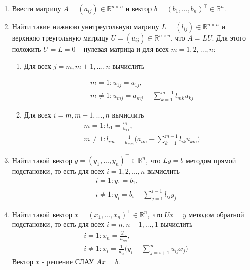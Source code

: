 \documentclass[a4paper, 12pt]{article}
\begin{document}
	\begin{enumerate}
		\item Ввести матрицу $A=(a_{ij})\in \mathbb{R}^{n\times n}$ и вектор $b=(b_1,...,b_n)^\top\in \mathbb{R}^n$.
		\item Найти такие нижнюю унитреугольную матрицу $L=(l_{ij})\in \mathbb{R}^{n\times n}$ и верхнюю треугольную матрицу $U=(u_{ij})\in \mathbb{R}^{n\times n}$, что $A=LU$. Для этого положить $U=L=0$ -- нулевая матрица и
		для всех $m = 1,2,...,n$:
		\begin{enumerate}
			\item Для всех $j = m,m+1,...,n$ вычислить

			\begin{equation} 
				\label{U_formula}
				\begin{aligned}
					&m=1:u_{1j}=a_{1j}, \\
					&m\neq 1: u_{mj}=a_{mj}-\sum\limits_{k=1}^{m-1}l_{mk}u_{kj}
				\end{aligned}
			\end{equation}
			\item Для всех $i = m,m+1,...,n$ вычислить
			\begin{equation}
				\label{L_formula}
				\begin{aligned}
					&m=1:l_{i1}=\frac{a_{i1}}{u_{11}},\\
					&m\neq 1:l_{im}=\frac{1}{u_{mm}}\Bigg(a_{im}-\sum\limits_{k=1}^{m-1} l_{ik}u_{km}\Bigg)
				\end{aligned}
			\end{equation}
		\end{enumerate}
		\item Найти такой вектор $y=(y_1,...,y_n)^\top \in \mathbb{R}^n$, что $Ly=b$ методом прямой подстановки, то есть для всех $i=1,2,...,n$ вычислить
		\begin{equation}
			\label{y_formula}
			\begin{aligned}
				&i=1:y_1=b_1, \\
				&i\neq 1:y_i=b_i-\sum\limits_{j=1}^{i-1}l_{ij}y_j
			\end{aligned}			
		\end{equation}
		\item Найти такой вектор $x=(x_1,...,x_n)^\top \in \mathbb{R}^n$, что $Ux=y$ методом обратной подстановки, то есть для всех $i=n,n-1,...,1$ вычислить
		\begin{equation}
			\label{x_formula}
			\begin{aligned}
				&i=1:x_n=\frac{y_n}{u_{nn}},\\
				&i\neq 1:x_i=\frac{1}{u_{ii}}\Bigg(y_i-\sum\limits_{j=i+1}^{n}u_{ij}x_j\Bigg)
			\end{aligned}
		\end{equation}
		Вектор $x$ - решение СЛАУ $Ax=b$.
	\end{enumerate}
\end{document}

